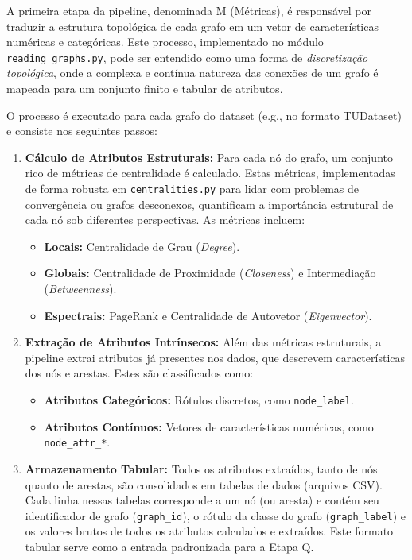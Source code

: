 \documentclass[12pt]{article}
\begin{document}
A primeira etapa da pipeline, denominada M (Métricas), é responsável por traduzir a estrutura topológica de cada grafo em um vetor de características numéricas e categóricas. Este processo, implementado no módulo \texttt{reading\_graphs.py}, pode ser entendido como uma forma de \textit{discretização topológica}, onde a complexa e contínua natureza das conexões de um grafo é mapeada para um conjunto finito e tabular de atributos.

O processo é executado para cada grafo do dataset (e.g., no formato TUDataset) e consiste nos seguintes passos:
\begin{enumerate}
    \item \textbf{Cálculo de Atributos Estruturais:} Para cada nó do grafo, um conjunto rico de métricas de centralidade é calculado. Estas métricas, implementadas de forma robusta em \texttt{centralities.py} para lidar com problemas de convergência ou grafos desconexos, quantificam a importância estrutural de cada nó sob diferentes perspectivas. As métricas incluem:
    \begin{itemize}
        \item \textbf{Locais:} Centralidade de Grau (\textit{Degree}).
        \item \textbf{Globais:} Centralidade de Proximidade (\textit{Closeness}) e Intermediação (\textit{Betweenness}).
        \item \textbf{Espectrais:} PageRank e Centralidade de Autovetor (\textit{Eigenvector}).
    \end{itemize}
    
    \item \textbf{Extração de Atributos Intrínsecos:} Além das métricas estruturais, a pipeline extrai atributos já presentes nos dados, que descrevem características dos nós e arestas. Estes são classificados como:
    \begin{itemize}
        \item \textbf{Atributos Categóricos:} Rótulos discretos, como \texttt{node\_label}.
        \item \textbf{Atributos Contínuos:} Vetores de características numéricas, como \texttt{node\_attr\_*}.
    \end{itemize}
    
    \item \textbf{Armazenamento Tabular:} Todos os atributos extraídos, tanto de nós quanto de arestas, são consolidados em tabelas de dados (arquivos CSV). Cada linha nessas tabelas corresponde a um nó (ou aresta) e contém seu identificador de grafo (\texttt{graph\_id}), o rótulo da classe do grafo (\texttt{graph\_label}) e os valores brutos de todos os atributos calculados e extraídos. Este formato tabular serve como a entrada padronizada para a Etapa Q.
\end{enumerate}
\end{document}
